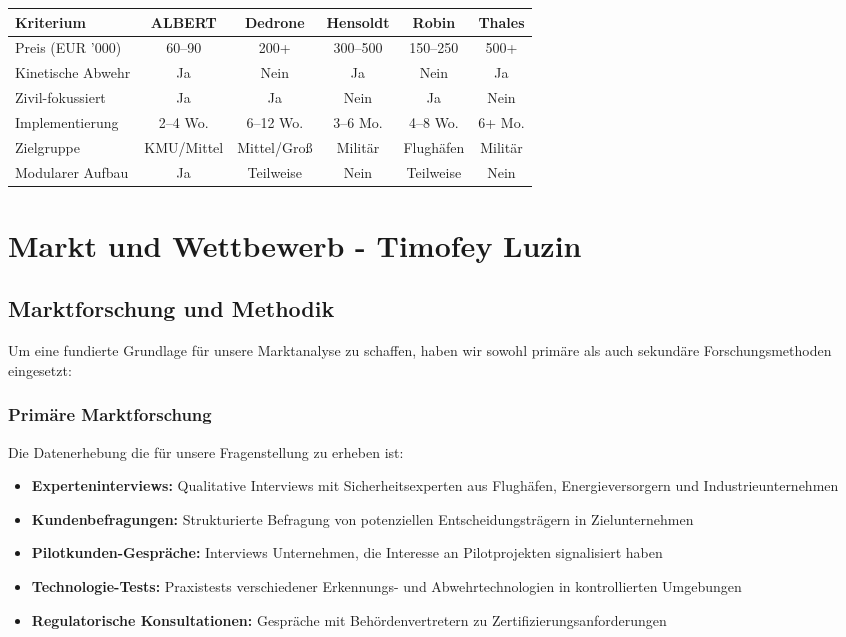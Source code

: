 \documentclass[11pt,a4paper]{article}
\begin{document}
\begin{center}
\begin{tabular}{|l|c|c|c|c|c|}
\hline
\textbf{Kriterium} & \textbf{ALBERT} & \textbf{Dedrone} & \textbf{Hensoldt} & \textbf{Robin} & \textbf{Thales} \\
\hline
Preis (EUR '000) & 60–90 & 200+ & 300–500 & 150–250 & 500+ \\
Kinetische Abwehr & Ja & Nein & Ja & Nein & Ja \\
Zivil-fokussiert & Ja & Ja & Nein & Ja & Nein \\
Implementierung & 2–4 Wo. & 6–12 Wo. & 3–6 Mo. & 4–8 Wo. & 6+ Mo. \\
Zielgruppe & KMU/Mittel & Mittel/Groß & Militär & Flughäfen & Militär \\
Modularer Aufbau & Ja & Teilweise & Nein & Teilweise & Nein \\
\hline
\end{tabular}
\end{center}
\vspace{1.5cm}

\newpage

\section{Markt und Wettbewerb - Timofey Luzin}


\subsection{Marktforschung und Methodik}

Um eine fundierte Grundlage für unsere Marktanalyse zu schaffen, haben wir sowohl primäre als auch sekundäre Forschungsmethoden eingesetzt:

\subsubsection*{Primäre Marktforschung}
Die Datenerhebung die für unsere Fragenstellung zu erheben ist:
\begin{itemize}
\item \textbf{Experteninterviews:} Qualitative Interviews mit Sicherheitsexperten aus Flughäfen, Energieversorgern und Industrieunternehmen
\item \textbf{Kundenbefragungen:} Strukturierte Befragung von potenziellen Entscheidungsträgern in Zielunternehmen
\item \textbf{Pilotkunden-Gespräche:} Interviews Unternehmen, die Interesse an Pilotprojekten signalisiert haben
\item \textbf{Technologie-Tests:} Praxistests verschiedener Erkennungs- und Abwehrtechnologien in kontrollierten Umgebungen
\item \textbf{Regulatorische Konsultationen:} Gespräche mit Behördenvertretern zu Zertifizierungsanforderungen
\end{itemize}
\end{document}
